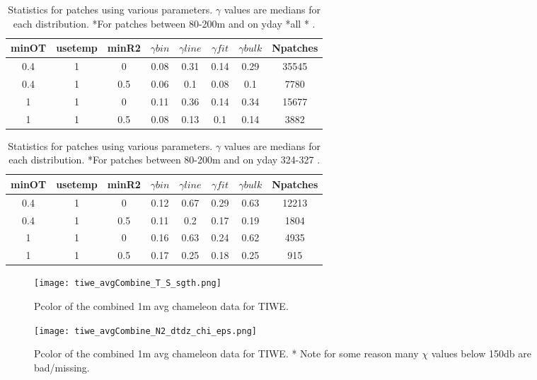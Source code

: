 \documentclass[11pt]{article}
\begin{document}
\begin{table}[htdp]
\caption{Statistics for patches using various parameters. $\gamma$ values are medians for each distribution. *For patches between 80-200m and on yday *all * .}
\begin{center}
\begin{tabular}{|c|c|c|c|c|c|c|c|}
\hline
minOT & usetemp & minR2 & $\gamma bin$ & $\gamma line$ & $\gamma fit$ & $\gamma bulk$ & Npatches \\
\hline
0.4 & 1 & 0 & 0.08 & 0.31 & 0.14 & 0.29 & 35545 \\
\hline
0.4 & 1 & 0.5 & 0.06 & 0.1 & 0.08 & 0.1 & 7780 \\
\hline
1 & 1 & 0 & 0.11 & 0.36 & 0.14 & 0.34 & 15677 \\
\hline
1 & 1 & 0.5 & 0.08 & 0.13 & 0.1 & 0.14 & 3882 \\
\hline
\end{tabular}
\end{center}
\label{tab}
\end{table}%


\begin{table}[htdp]
\caption{Statistics for patches using various parameters. $\gamma$ values are medians for each distribution. *For patches between 80-200m and on yday 324-327 .}
\begin{center}
\begin{tabular}{|c|c|c|c|c|c|c|c|}
\hline
minOT & usetemp & minR2 & $\gamma bin$ & $\gamma line$ & $\gamma fit$ & $\gamma bulk$ & Npatches \\
\hline
0.4 & 1 & 0 & 0.12 & 0.67 & 0.29 & 0.63 & 12213 \\
\hline
0.4 & 1 & 0.5 & 0.11 & 0.2 & 0.17 & 0.19 & 1804 \\
\hline
1 & 1 & 0 & 0.16 & 0.63 & 0.24 & 0.62 & 4935 \\
\hline
1 & 1 & 0.5 & 0.17 & 0.25 & 0.18 & 0.25 & 915 \\
\hline
\hline
\end{tabular}
\end{center}
\label{tab}
\end{table}%


\begin{figure}[htbp]
\texttt{[image: tiwe\_avgCombine\_T\_S\_sgth.png]}
\caption{Pcolor of the combined 1m avg chameleon data for TIWE.}
\label{1mavgsumTS}
\end{figure}


\begin{figure}[htbp]
\texttt{[image: tiwe\_avgCombine\_N2\_dtdz\_chi\_eps.png]}
\caption{Pcolor of the combined 1m avg chameleon data for TIWE. * Note for some reason many $\chi$ values below 150db are bad/missing.}
\label{1mavgsum}
\end{figure}
\end{document}
